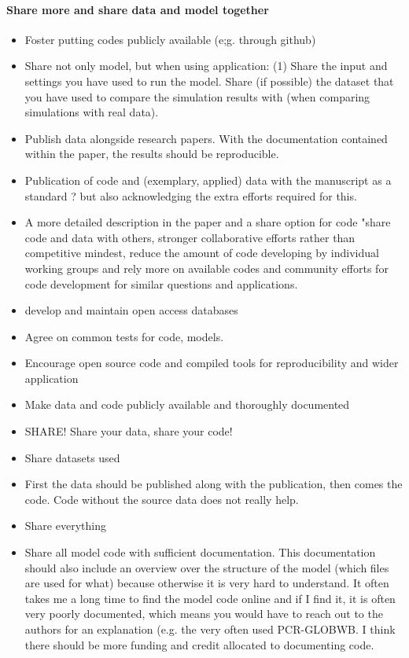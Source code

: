 \documentclass{article}
\begin{document}
\paragraph{Share more and share data and model together}
\begin{itemize}
	\item Foster putting codes publicly available (e;g. through github)
	\item Share not only model, but when using application: (1) Share the input and settings you have used to run the model. Share (if possible) the dataset that you have used to compare the simulation results with (when comparing simulations with real data).
	\item Publish data alongside research papers. With the documentation contained within the paper, the results should be reproducible.
	\item Publication of code and (exemplary, applied) data with the manuscript as a standard ? but also acknowledging the extra efforts required for this.
	\item A more detailed description in the paper and a share option for code "share code and data with others, stronger collaborative efforts rather than competitive mindest, reduce the amount of code developing by individual working groups and rely more on available codes and community efforts for code development for similar questions and applications.
	\item develop and maintain open access databases
	\item Agree on common tests for code, models.
	\item Encourage open source code and compiled tools for reproducibility and wider application
	\item Make data and code publicly available and thoroughly documented
	\item SHARE! Share your data, share your code!
	\item Share datasets used
	\item First the data should be published along with the publication, then comes the code. Code without the source data does not really help.
	\item Share everything
	\item Share all model code with sufficient documentation. This documentation should also include an overview over the structure of the model (which files are used for what) because otherwise it is very hard to understand. It often takes me a long time to find the model code online and if I find it, it is often very poorly documented, which means you would have to reach out to the authors for an explanation (e.g. the very often used PCR-GLOBWB.  I think there should be more funding and credit allocated to documenting code.

\end{itemize}
\end{document}
